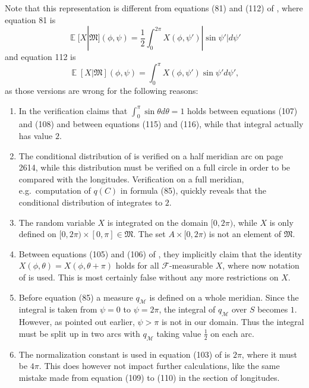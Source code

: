 \documentclass[twoside,a4paper]{report}
\theoremstyle{plain}
\theoremstyle{definition}
\theoremstyle{remark}
\numberwithin{equation}{chapter}
\DeclareMathOperator{\E}{\mathbb{E}}
\DeclareMathOperator{\1}{\mathbbm{1}}
\newcommand{\F}{\mathcal{F}}
\begin{document}
Note that this representation is different from equations (81) and (112) of \cite{Gyenis17}, where equation 81 is
\begin{equation}
\E[X|\mathfrak{M}](\phi,\psi)=\frac{1}{2}\int_0^{2\pi}X(\phi,\psi')|\sin\psi'|d\psi'
\end{equation}
and equation 112 is
\begin{equation}
\E[X|\mathfrak{M}](\phi,\psi)=\int_0^{\pi}X(\phi,\psi')\sin\psi'd\psi',
\end{equation}
as those versions are wrong for the following reasons:
\begin{enumerate}
\item In the verification \cite{Gyenis17} claims that $\int_0^\pi\sin\theta d\theta=1$ holds between equations (107) and (108) and between equations (115) and (116), while that integral actually has value $2$.
\item The conditional distribution of \cite{Gyenis17} is verified on a half meridian arc on page 2614, while this distribution must be verified on a full circle in order to be compared with the longitudes. Verification on a full meridian, e.g.~computation of $q(C)$ in formula (85), quickly reveals that the conditional distribution of \cite{Gyenis17} integrates to $2$.
\item The random variable $X$ is integrated on the domain $[0,2\pi)$, while $X$ is only defined on $[0,2\pi)\times[0,\pi]\in\mathfrak{M}$. The set $A\times[0,2\pi)$ is not an element of $\mathfrak{M}$.
\item Between equations (105) and (106) of \cite{Gyenis17}, they implicitly claim that the identity $X(\phi,\theta)=X(\phi,\theta+\pi)$ holds for all $\F$-measurable $X$, where now notation of \cite{Gyenis17} is used. This is most certainly false without any more restrictions on $X$.
\item Before equation (85) a measure $q_\mathcal{M}$ is defined on a whole meridian. Since the integral is taken from $\psi=0$ to $\psi=2\pi$, the integral of $q_\mathcal{M}$ over $S$ becomes $1$. However, as pointed out earlier, $\psi>\pi$ is not in our domain. Thus the integral must be split up in two arcs with $q_{\mathcal{M}}$ taking value $\frac{1}{2}$ on each arc.
\item The normalization constant is used in equation (103) of \cite{Gyenis17} is $2\pi$, where it must be $4\pi$. This does however not impact further calculations, like the same mistake made from equation (109) to (110) in the section of longitudes.
\end{enumerate}
\end{document}
